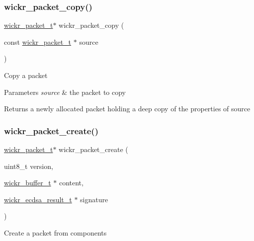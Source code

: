 \subsubsection{\texorpdfstring{wickr\+\_\+packet\+\_\+copy()}{wickr\_packet\_copy()}}
{\footnotesize\ttfamily \hyperlink{structwickr__packet}{wickr\+\_\+packet\+\_\+t}$\ast$ wickr\+\_\+packet\+\_\+copy (\begin{DoxyParamCaption}\item[{const \hyperlink{structwickr__packet}{wickr\+\_\+packet\+\_\+t} $\ast$}]{source }\end{DoxyParamCaption})}

Copy a packet


\begin{DoxyParams}{Parameters}
{\em source} & the packet to copy \\
\hline
\end{DoxyParams}
\begin{DoxyReturn}{Returns}
a newly allocated packet holding a deep copy of the properties of \textquotesingle{}source\textquotesingle{} 
\end{DoxyReturn}
\mbox{\label{group__wickr__protocol_gac952913ddaf848d2def181cd55b30883}} 
\subsubsection{\texorpdfstring{wickr\+\_\+packet\+\_\+create()}{wickr\_packet\_create()}}
{\footnotesize\ttfamily \hyperlink{structwickr__packet}{wickr\+\_\+packet\+\_\+t}$\ast$ wickr\+\_\+packet\+\_\+create (\begin{DoxyParamCaption}\item[{uint8\+\_\+t}]{version,  }\item[{\hyperlink{structwickr__buffer}{wickr\+\_\+buffer\+\_\+t} $\ast$}]{content,  }\item[{\hyperlink{structwickr__ecdsa__result}{wickr\+\_\+ecdsa\+\_\+result\+\_\+t} $\ast$}]{signature }\end{DoxyParamCaption})}

Create a packet from components


